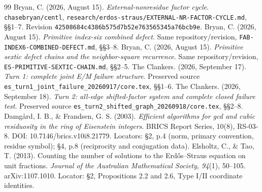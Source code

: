 \begin{thebibliography}{99}
 Bryan, C. (2026, August 15). \emph{External-nonresidue factor cycle}.
\texttt{chasebryan/centl}, \texttt{research/erdos-straus/EXTERNAL-NR-FACTOR-CYCLE.md},
\S\S1--7. Revision \texttt{42508684c4386b575d7b52e763565345a76bcb9e}.
 Bryan, C. (2026, August 15). \emph{Primitive index-six combined defect}.
Same repository/revision, \texttt{FAB-INDEX6-COMBINED-DEFECT.md}, \S\S3--8.
 Bryan, C. (2026, August 15). \emph{Primitive sextic defect chains and the neighbor-square recurrence}.
Same repository/revision, \texttt{ES-PRIMITIVE-SEXTIC-CHAIN.md}, \S\S2--5.
 The Clankers. (2026, September 17). \emph{Turn 1: complete joint E/M failure structure}.
Preserved source \texttt{es\_turn1\_joint\_failure\_20260917/core.tex}, \S\S1--6.
 The Clankers. (2026, September 18). \emph{Turn 2: all-edge shifted-factor system and complete closed failure test}.
Preserved source \texttt{es\_turn2\_shifted\_graph\_20260918/core.tex}, \S\S2--8.
 Damg\aa rd, I. B., \& Frandsen, G. S. (2003).
\emph{Efficient algorithms for gcd and cubic residuosity in the ring of Eisenstein integers}.
BRICS Report Series, 10(8), RS-03-8. DOI: 10.7146/brics.v10i8.21779.
Locators: \S2, p.4 (norm, primary convention, residue symbol); \S4, p.8 (reciprocity and conjugation data).
 Elsholtz, C., \& Tao, T. (2013). Counting the number of solutions to the
Erd\H{o}s--Straus equation on unit fractions. \emph{Journal of the Australian
Mathematical Society, 94}(1), 50--105. arXiv:1107.1010.
Locator: \S2, Propositions 2.2 and 2.6, Type I/II coordinate identities.
\end{thebibliography}
